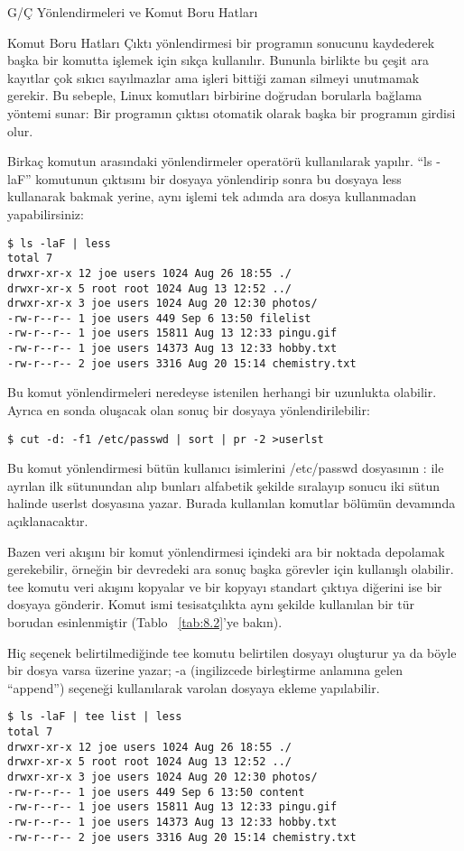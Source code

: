 \begin{section}{G/Ç Yönlendirmeleri ve Komut Boru Hatları}
\begin{subsection}{Komut Boru Hatları}
Çıktı yönlendirmesi bir programın sonucunu kaydederek başka bir komutta işlemek için sıkça kullanılır. Bununla birlikte bu çeşit ara kayıtlar çok sıkıcı sayılmazlar ama işleri bittiği zaman silmeyi unutmamak gerekir. Bu sebeple, Linux komutları birbirine doğrudan borularla bağlama yöntemi sunar: Bir programın çıktısı otomatik olarak başka bir programın girdisi olur.

Birkaç komutun arasındaki yönlendirmeler \textbar operatörü kullanılarak yapılır. “ls -laF” komutunun çıktısını bir dosyaya yönlendirip sonra bu dosyaya less kullanarak bakmak yerine, aynı işlemi tek adımda ara dosya kullanmadan yapabilirsiniz:

\footnotesize
\begin{verbatim}
$ ls -laF | less
total 7
drwxr-xr-x 12 joe users 1024 Aug 26 18:55 ./
drwxr-xr-x 5 root root 1024 Aug 13 12:52 ../
drwxr-xr-x 3 joe users 1024 Aug 20 12:30 photos/
-rw-r--r-- 1 joe users 449 Sep 6 13:50 filelist
-rw-r--r-- 1 joe users 15811 Aug 13 12:33 pingu.gif
-rw-r--r-- 1 joe users 14373 Aug 13 12:33 hobby.txt
-rw-r--r-- 2 joe users 3316 Aug 20 15:14 chemistry.txt
\end{verbatim}
\normalsize

Bu komut yönlendirmeleri neredeyse istenilen herhangi bir uzunlukta olabilir. Ayrıca en sonda oluşacak olan sonuç bir dosyaya yönlendirilebilir:
\begin{verbatim}
$ cut -d: -f1 /etc/passwd | sort | pr -2 >userlst
\end{verbatim}

Bu komut yönlendirmesi bütün kullanıcı isimlerini /etc/passwd dosyasının : ile ayrılan ilk sütunundan alıp bunları alfabetik şekilde sıralayıp sonucu iki sütun halinde userlst dosyasına yazar. Burada kullanılan komutlar bölümün devamında açıklanacaktır.

Bazen veri akışını bir komut yönlendirmesi içindeki ara bir noktada depolamak gerekebilir, örneğin bir devredeki ara sonuç başka görevler için kullanışlı olabilir. tee komutu veri akışını kopyalar ve bir kopyayı standart çıktıya diğerini ise bir dosyaya gönderir. Komut ismi tesisatçılıkta aynı şekilde kullanılan bir tür borudan esinlenmiştir (Tablo ~\ref{tab:8.2}'ye bakın).

Hiç seçenek belirtilmediğinde tee komutu belirtilen dosyayı oluşturur ya da böyle bir dosya varsa üzerine yazar; -a (ingilizcede birleştirme anlamına gelen “append”) seçeneği kullanılarak varolan dosyaya ekleme yapılabilir.

\footnotesize
\begin{verbatim}
$ ls -laF | tee list | less
total 7
drwxr-xr-x 12 joe users 1024 Aug 26 18:55 ./
drwxr-xr-x 5 root root 1024 Aug 13 12:52 ../
drwxr-xr-x 3 joe users 1024 Aug 20 12:30 photos/
-rw-r--r-- 1 joe users 449 Sep 6 13:50 content
-rw-r--r-- 1 joe users 15811 Aug 13 12:33 pingu.gif
-rw-r--r-- 1 joe users 14373 Aug 13 12:33 hobby.txt
-rw-r--r-- 2 joe users 3316 Aug 20 15:14 chemistry.txt
\end{verbatim}
\normalsize


\end{subsection}
\end{section}
